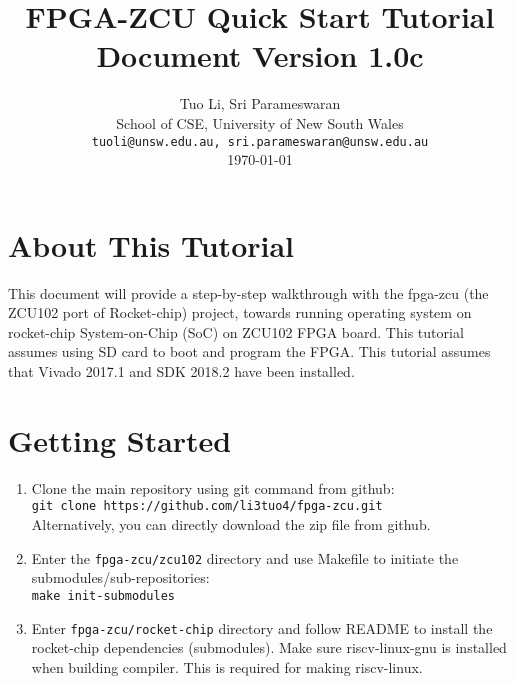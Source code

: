 \documentclass[a4paper,11pt]{article}
\begin{document}
\title{\vspace{-0.7in}\Large {\bf FPGA-ZCU Quick Start Tutorial} \\
Document Version 1.0c
  \vspace{-0.1in}}

\author{Tuo Li, Sri Parameswaran\\
  School of CSE, University of New South Wales \\
  {\tt tuoli@unsw.edu.au, sri.parameswaran@unsw.edu.au} \\
  \today
}
\date{} 

\newpage

\maketitle

\newpage

\section*{About This Tutorial}
This document will provide a step-by-step walkthrough with the fpga-zcu (the ZCU102 port of Rocket-chip) project, towards running operating system on rocket-chip System-on-Chip (SoC) on ZCU102 FPGA board. 
This tutorial assumes using SD card to boot and program the FPGA.
This tutorial assumes that Vivado 2017.1 and SDK 2018.2 have been installed. 
\newpage

\section{Getting Started}

\begin{enumerate}
\item Clone the main repository using git command from github:\\
 {\tt git clone https://github.com/li3tuo4/fpga-zcu.git}\\
 Alternatively, you can directly download the zip file from github.
\item Enter the {\tt fpga-zcu/zcu102} directory and use Makefile to initiate the submodules/sub-repositories:\\
 {\tt make init-submodules}
 \item Enter {\tt fpga-zcu/rocket-chip} directory and follow README to install the rocket-chip dependencies (submodules). Make sure riscv-linux-gnu is installed when building compiler. This is required for making riscv-linux.
\end{enumerate}
\end{document}
